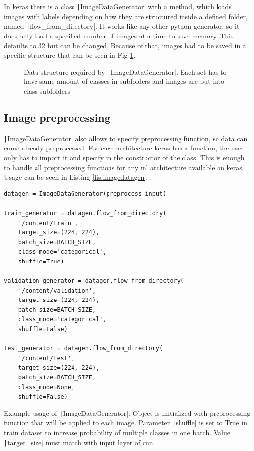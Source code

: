 \documentclass[thesis=B,english]{FITthesis}[2019/12/23]
\begin{document}
In keras there is a class \texttt|ImageDataGenerator| with a method, which loads images with labels depending on how they are structured inside a defined folder, named  \texttt|flow_from_directory|. It works like any other python generator, so it does only load a specified number of images at a time to save memory. This defaults to 32 but can be changed. Because of that, images had to be saved in a specific structure that can be seen in Fig \ref{fig:data_structure}. 

\begin{figure}
    \caption[Data structure]{Data structure required by \texttt|ImageDataGenerator|. Each set has to have same amount of classes in subfolders and images are put into class subfolders}
    \label{fig:data_structure}
\end{figure}

\subsection{Image preprocessing}
\texttt|ImageDataGenerator| also allows to specify preprocessing function, so data can come already preprocessed. For each architecture keras has a function, the user only has to import it and specify in the constructor of the class. This is enough to handle all preprocessing functions for any \gls{ml} architecture available on keras. Usage can be seen in Listing \ref{lis:imagedatagen}.

\begin{listing}
    \begin{verbatim}
datagen = ImageDataGenerator(preprocess_input) 

train_generator = datagen.flow_from_directory(
    '/content/train',
    target_size=(224, 224),
    batch_size=BATCH_SIZE,
    class_mode='categorical',
    shuffle=True)

validation_generator = datagen.flow_from_directory(
    '/content/validation',
    target_size=(224, 224),
    batch_size=BATCH_SIZE,
    class_mode='categorical',
    shuffle=False)

test_generator = datagen.flow_from_directory(
    '/content/test',
    target_size=(224, 224),
    batch_size=BATCH_SIZE,
    class_mode=None,
    shuffle=False)

    \end{verbatim}
    \caption[Example usage of ImageDataGenerator ]{Example usage of \texttt|ImageDataGenerator|. Object is initialized with preprocessing  function that will be applied to each image. Parameter \texttt|shuffle| is set to True in train dataset to increase probability of multiple classes in one batch. Value \texttt|target_size| must match with input layer of \gls{cnn}.}
    \label{lis:imagedatagen}
\end{listing}
\end{document}
